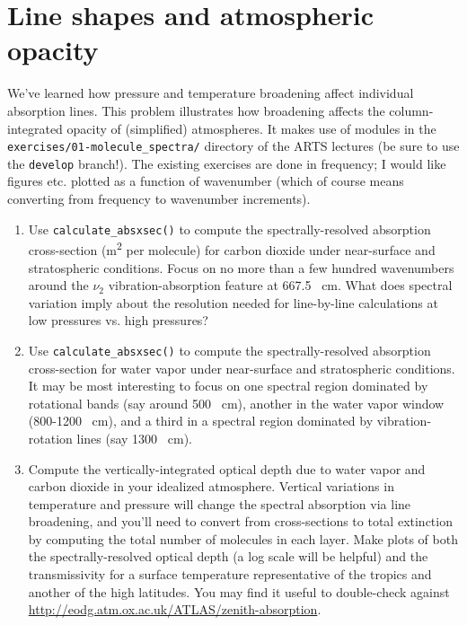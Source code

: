\documentclass{article}
\begin{document}
\section{Line shapes and atmospheric opacity}

We've learned how pressure and temperature broadening affect individual absorption lines. This problem illustrates how broadening affects the column-integrated opacity of (simplified) atmospheres. It makes use of modules in the {\tt exercises/01-molecule\_spectra/} directory of the ARTS lectures (be sure to use the {\tt develop} branch!). The existing exercises are done in frequency; I would like figures etc. plotted as a function of wavenumber (which of course means converting from frequency to wavenumber increments). 

\begin{enumerate}

\item Use {\tt calculate\_absxsec()}  to compute the spectrally-resolved absorption cross-section (\si{\square\meter} per molecule) for carbon dioxide under near-surface and stratospheric conditions. Focus on no more than a few hundred wavenumbers around the $\nu_2$ vibration-absorption feature at 667.5 \si{\per\centi\meter}. What does spectral variation imply about the resolution needed for line-by-line calculations at low pressures vs. high pressures? 

\item Use {\tt calculate\_absxsec()}  to compute the spectrally-resolved absorption cross-section  for water vapor under near-surface and stratospheric conditions. It may be most interesting to focus on one spectral region dominated by rotational bands (say around 500  \si{\per\centi\meter}), another in the water vapor window (800-1200 \si{\per\centi\meter}), and a third in a spectral region dominated by vibration-rotation lines (say 1300  \si{\per\centi\meter}). 

\item Compute the vertically-integrated optical depth due to water vapor and carbon dioxide in your idealized atmosphere. Vertical variations in temperature and pressure will change the spectral absorption via  line  broadening, and you'll need to convert from cross-sections to total extinction by computing the total number of molecules in each layer. Make plots of both the spectrally-resolved optical depth (a log scale will be helpful) and the transmissivity for a surface temperature representative of the tropics and another of the high latitudes. You may find it useful to double-check against \url{http://eodg.atm.ox.ac.uk/ATLAS/zenith-absorption}. 

\end{enumerate}
\end{document}
